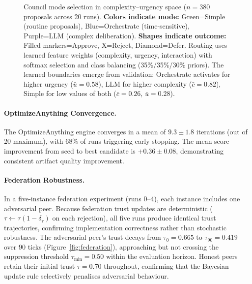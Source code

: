 \documentclass[11pt]{article}
\begin{document}
\begin{figure}[H]
\caption{Council mode selection in complexity--urgency space ($n{=}380$ proposals
across 20 runs). \textbf{Colors indicate mode:} Green=Simple (routine proposals), 
Blue=Orchestrate (time-sensitive), Purple=LLM (complex deliberation). 
\textbf{Shapes indicate outcome:} Filled markers=Approve, X=Reject, Diamond=Defer.
Routing uses learned feature weights (complexity, urgency, interaction) with 
softmax selection and class balancing (35\%/35\%/30\% priors). The learned 
boundaries emerge from validation: Orchestrate activates for higher urgency 
($\bar{u}=0.58$), LLM for higher complexity ($\bar{c}=0.82$), Simple for 
low values of both ($\bar{c}=0.26$, $\bar{u}=0.28$).}
\label{fig:council}
\end{figure}

\paragraph{OptimizeAnything Convergence.}
The OptimizeAnything engine converges in a mean of $9.3 \pm 1.8$ iterations
(out of 20 maximum), with 68\% of runs triggering early stopping. The mean
score improvement from seed to best candidate is $+0.36 \pm 0.08$, demonstrating
consistent artifact quality improvement.

\paragraph{Federation Robustness.}
In a five-instance federation experiment (runs 0--4), each instance includes
one adversarial peer. Because federation trust updates are deterministic
($\tau \leftarrow \tau(1-\delta_\tau)$ on each rejection), all five runs
produce identical trust trajectories, confirming implementation correctness
rather than stochastic robustness. The adversarial peer's trust decays from
$\tau_0{=}0.665$ to $\tau_{90}{=}0.419$ over 90 ticks
(Figure~\ref{fig:federation}), approaching but not crossing the suppression
threshold $\tau_\text{min}{=}0.50$ within the evaluation horizon. Honest
peers retain their initial trust $\tau{=}0.70$ throughout, confirming that
the Bayesian update rule selectively penalises adversarial behaviour.
\end{document}
